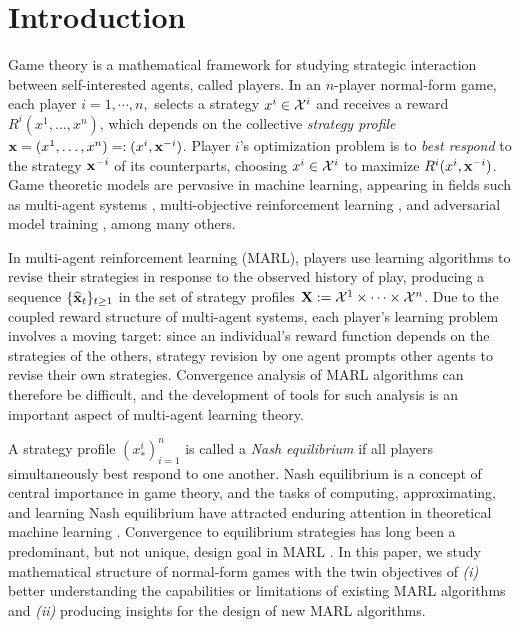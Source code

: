 \section{Introduction}

Game theory is a mathematical framework for studying strategic interaction between self-interested agents, called players. In an $n$-player normal-form game, each player $i = 1, \cdots, n,$ selects a strategy $x^i \in \mathcal{X}^i$  and receives a reward $R^i ( x^1, \dots, x^n )$, which depends on the collective \textit{strategy profile} ${\mathbf{x}} = ( x^1, \dots, x^n) =: (x^i , {\mathbf{x}}^{-i})$. Player $i$'s optimization problem is to \emph{best respond} to the strategy ${\mathbf{x}}^{-i}$ of its counterparts, choosing $x^i \in \mathcal{X}^i$ to maximize $R^i ( x^i, {\mathbf{x}}^{-i})$. Game theoretic models are pervasive in machine learning, appearing in fields such as multi-agent systems \cite{gronauer2022multi}, multi-objective reinforcement learning \cite{hayes2022practical}, and adversarial model training \cite{bose2020adversarial},  among many others.  

In multi-agent reinforcement learning (MARL), players use learning algorithms to revise their strategies in response to the observed history of play, producing a sequence $\{ \widehat{{\mathbf{x}}}_t \}_{t \geq 1}$ in the set of strategy profiles ${\mathbf{X}} := \mathcal{X}^1 \times \cdots \times \mathcal{X}^n$. Due to the coupled reward structure of multi-agent systems, each player's learning problem involves a moving target: since an individual's reward function depends on the strategies of the others, strategy revision by one agent prompts other agents to revise their own strategies. Convergence analysis of MARL algorithms can therefore be difficult, and the development of tools for such analysis is an important aspect of multi-agent learning theory. 

A strategy profile $( x_{*}^{i} )_{i=1}^n$ is called a \textit{Nash equilibrium} if all players simultaneously best respond to one another. Nash equilibrium is a concept of central importance in game theory, and the tasks of computing, approximating, and learning Nash equilibrium have attracted enduring attention in theoretical machine learning \cite{singh2000nash,jafari2001no,daskalakis2010learning,nowe2012game,flokas2020no,hsieh2021adaptive,lu2023two}. Convergence to equilibrium strategies has long been a predominant, but not unique, design goal in MARL \cite{zhang2021multi}. In this paper, we study mathematical structure of normal-form games with the twin objectives of \textit{(i)} better understanding the capabilities or limitations of existing MARL algorithms and \textit{(ii)} producing insights for the design of new MARL algorithms.


